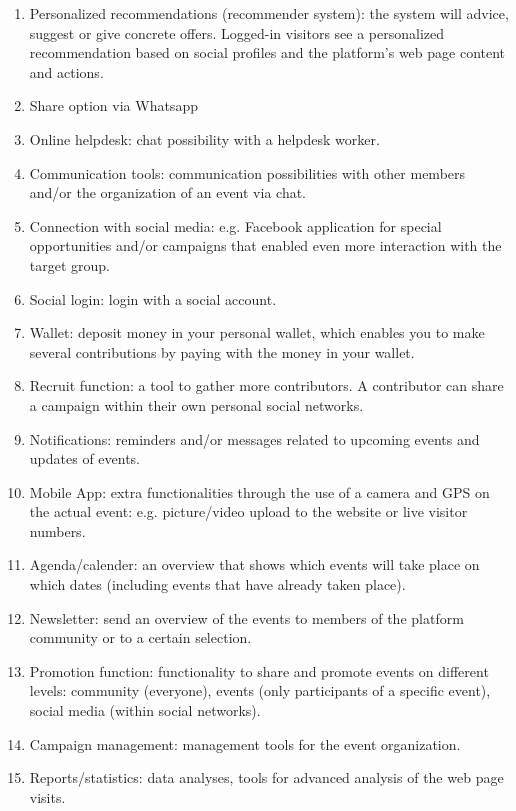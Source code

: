 \begin{enumerate}
    \item
          Personalized recommendations (recommender system): the system will advice, suggest or give concrete offers. Logged-in visitors see a personalized recommendation based on social profiles and the
          platform’s web page content and actions.
    \item
          Share option via Whatsapp
    \item
          Online helpdesk: chat possibility with a helpdesk worker.
    \item
          Communication tools: communication possibilities with other members and/or the organization of an
          event via chat.
    \item
          Connection with social media: e.g. Facebook application for special opportunities and/or campaigns
          that enabled even more interaction with the target group.
    \item
          Social login: login with a social account.
    \item
          Wallet: deposit money in your personal wallet, which enables you to make several contributions by
          paying with the money in your wallet.
    \item
          Recruit function: a tool to gather more contributors. A contributor can share a campaign within their
          own personal social networks.
    \item
          Notifications: reminders and/or messages related to upcoming events and updates of events.
    \item
          Mobile App: extra functionalities through the use of a camera and GPS on the actual event: e.g. picture/video upload to the website or live visitor numbers.

    \item
          Agenda/calender: an overview that shows which events will take place on which dates (including events
          that have already taken place).
    \item
          Newsletter: send an overview of the events to members of the platform community or to a certain
          selection.
    \item
          Promotion function: functionality to share and promote events on different levels: community (everyone), events (only participants of a specific event), social media (within social networks).
    \item
          Campaign management: management tools for the event organization.
    \item
          Reports/statistics: data analyses, tools for advanced analysis of the web page visits.
\end{enumerate}




